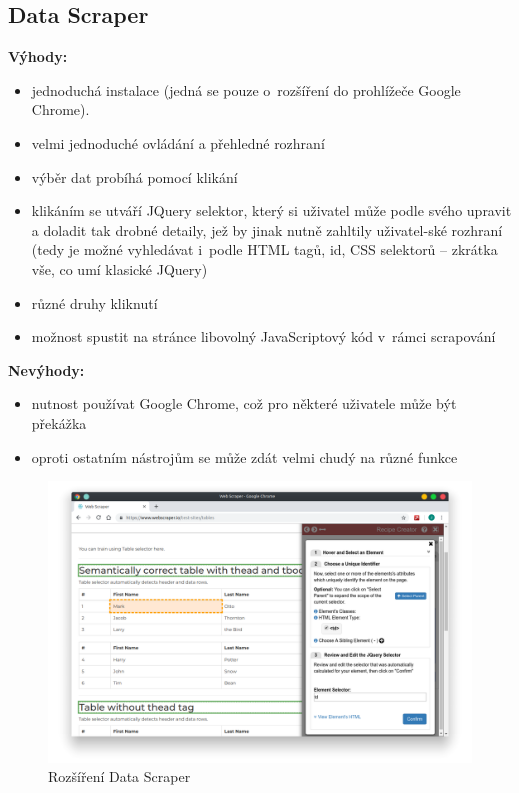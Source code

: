 \documentclass[thesis=B,czech]{FITthesis}[2012/06/26]
\begin{document}
\subsection{Data Scraper}
\textbf{Výhody:}
\begin{itemize}
	\item jednoduchá instalace (jedná se pouze o~rozšíření do prohlížeče Google Chrome).
	\item velmi jednoduché ovládání a přehledné rozhraní
	\item výběr dat probíhá pomocí klikání
	\item klikáním se utváří JQuery selektor, který si uživatel může podle svého upravit a doladit tak drobné detaily, jež by jinak nutně zahltily uživatel-ské rozhraní (tedy je možné vyhledávat i~podle HTML tagů, id, CSS selektorů -- zkrátka vše, co umí klasické JQuery)
	\item různé druhy kliknutí
	\item možnost spustit na stránce libovolný JavaScriptový kód v~rámci scrapování
\end{itemize}
\textbf{Nevýhody:}
\begin{itemize}
	\item nutnost používat Google Chrome, což pro některé uživatele může být překážka
	\item oproti ostatním nástrojům se může zdát velmi chudý na různé funkce
\end{itemize}
\begin{figure}
	\includegraphics[width=\linewidth]{images/DataScraper.png}
	\caption{Rozšíření Data Scraper~\cite[snímek pořídil autor]{data_scraper}}
	\label{fig:dataScraper}
\end{figure}
\end{document}
